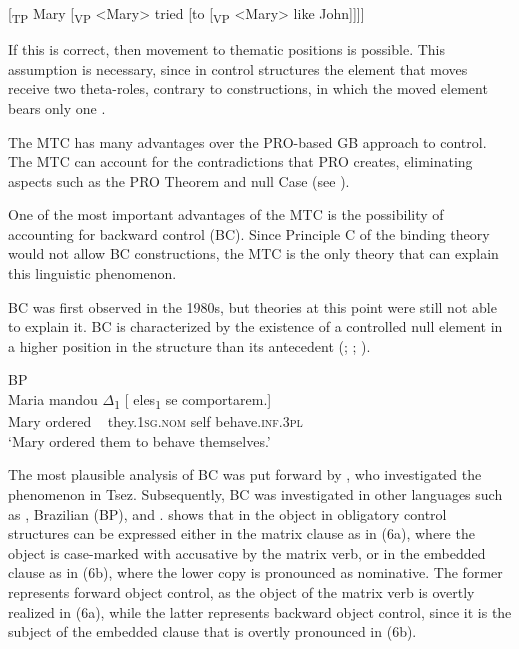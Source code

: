 \documentclass[output=paper]{langsci/langscibook}
\begin{document}
\ea%
\label{ex:moreno:4b}
[\textsubscript{TP} Mary [\textsubscript{VP} <Mary> tried [to [\textsubscript{VP} <Mary> like John]]]]
\z

If this is correct, then movement to thematic positions is possible. This assumption is necessary, since in control structures the element that moves receive two theta-roles, contrary to  constructions, in which the moved element bears only one  \citep{Hornstein1999}.

The MTC has many advantages over the PRO-based GB approach to control. The MTC can account for the contradictions that PRO creates, eliminating aspects such as the PRO Theorem and null Case (see \citealt{Hornstein2001}). 

One of the most important advantages of the MTC is the possibility of accounting for backward control (BC). Since Principle C of the binding theory would not allow BC constructions, the MTC is the only theory that can explain this linguistic phenomenon. 

BC was first observed in the 1980s, but theories at this point were still not able to explain it. BC is characterized by the existence of a controlled null element in a higher position in the structure than its antecedent (\citealt{Farrell1995}; \citealt{Rodrigues2004}; \citealt{Boeckx2006}). 

\ea%
    BP\label{ex:moreno:3}\\
    \gll Maria mandou ${\Delta}$\textsubscript{1} [ eles\textsubscript{1} se comportarem.]  \\
         Mary ordered ~ {} they.\textsc{1sg.nom} self behave.\textsc{inf.3pl}\\
    \glt ‘Mary ordered them to behave themselves.’
    \z

The most plausible analysis of BC was put forward by \citet{Polinsky2002}, who investigated the phenomenon in Tsez. Subsequently, BC was investigated in other languages such as , Brazilian  (BP),  and . \citet{Potsdam2009} shows that in  the object in obligatory control structures can be expressed either in the matrix clause as in (6a), where the object is case-marked with accusative by the matrix verb, or in the embedded clause as in (6b), where the lower copy is pronounced as nominative. The former represents forward object control, as the object of the matrix verb is overtly realized in (6a), while the latter represents backward object control, since it is the subject of the embedded clause that is overtly pronounced in (6b).
\end{document}
